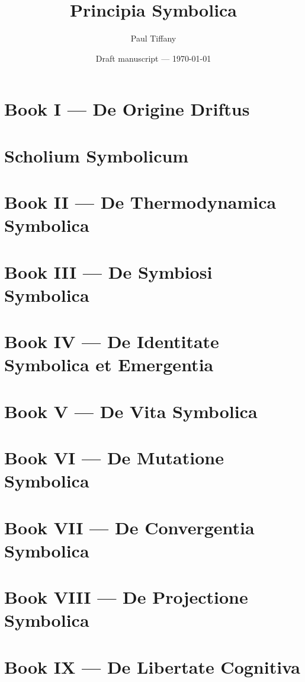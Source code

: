 \documentclass[11pt]{book}
\title{Principia Symbolica}
\author{Paul Tiffany}
\date{Draft manuscript --- \today}
\theoremstyle{plain}
\theoremstyle{definition}
\theoremstyle{remark}
\begin{document}
\maketitle
\tableofcontents

\chapter{Book I — De Origine Driftus}

\chapter*{Scholium Symbolicum}

\chapter{Book II — De Thermodynamica Symbolica}

\chapter{Book III — De Symbiosi Symbolica}

\chapter{Book IV — De Identitate Symbolica et Emergentia}


\chapter{Book V — De Vita Symbolica}


\chapter{Book VI — De Mutatione Symbolica}

\chapter{Book VII — De Convergentia Symbolica}

\chapter{Book VIII — De Projectione Symbolica}

\chapter{Book IX — De Libertate Cognitiva}

\cleardoublepage

\appendix







\end{document}
